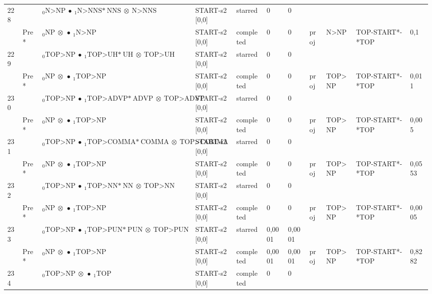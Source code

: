 \documentclass[10pt]{article}
\begin{document}
\begin{longtable}[htbp]{lllllllllll}
228 & & $ {}_0 \textrm{N>NP} \  \bullet \ {}_{1} \textrm{N>NNS*} \ \textrm{NNS} \  \otimes \ \textrm{N>NNS} $ & START-s2 [0,0] & starred & 0 & 0 & & & & \\ 
 & Pre *& $ {}_0 \textrm{NP} \  \otimes \  \bullet \ {}_{1} \textrm{N>NP} $ & START-s2 [0,0] & completed & 0 & 0 & proj & N>NP & TOP-START*-*TOP & 0,1 \\ 
229 & & $ {}_0 \textrm{TOP>NP} \  \bullet \ {}_{1} \textrm{TOP>UH*} \ \textrm{UH} \  \otimes \ \textrm{TOP>UH} $ & START-s2 [0,0] & starred & 0 & 0 & & & & \\ 
 & Pre *& $ {}_0 \textrm{NP} \  \otimes \  \bullet \ {}_{1} \textrm{TOP>NP} $ & START-s2 [0,0] & completed & 0 & 0 & proj & TOP>NP & TOP-START*-*TOP & 0,011 \\ 
230 & & $ {}_0 \textrm{TOP>NP} \  \bullet \ {}_{1} \textrm{TOP>ADVP*} \ \textrm{ADVP} \  \otimes \ \textrm{TOP>ADVP} $ & START-s2 [0,0] & starred & 0 & 0 & & & & \\ 
 & Pre *& $ {}_0 \textrm{NP} \  \otimes \  \bullet \ {}_{1} \textrm{TOP>NP} $ & START-s2 [0,0] & completed & 0 & 0 & proj & TOP>NP & TOP-START*-*TOP & 0,005 \\ 
231 & & $ {}_0 \textrm{TOP>NP} \  \bullet \ {}_{1} \textrm{TOP>COMMA*} \ \textrm{COMMA} \  \otimes \ \textrm{TOP>COMMA} $ & START-s2 [0,0] & starred & 0 & 0 & & & & \\ 
 & Pre *& $ {}_0 \textrm{NP} \  \otimes \  \bullet \ {}_{1} \textrm{TOP>NP} $ & START-s2 [0,0] & completed & 0 & 0 & proj & TOP>NP & TOP-START*-*TOP & 0,0553 \\ 
232 & & $ {}_0 \textrm{TOP>NP} \  \bullet \ {}_{1} \textrm{TOP>NN*} \ \textrm{NN} \  \otimes \ \textrm{TOP>NN} $ & START-s2 [0,0] & starred & 0 & 0 & & & & \\ 
 & Pre *& $ {}_0 \textrm{NP} \  \otimes \  \bullet \ {}_{1} \textrm{TOP>NP} $ & START-s2 [0,0] & completed & 0 & 0 & proj & TOP>NP & TOP-START*-*TOP & 0,0005 \\ 
233 & & $ {}_0 \textrm{TOP>NP} \  \bullet \ {}_{1} \textrm{TOP>PUN*} \ \textrm{PUN} \  \otimes \ \textrm{TOP>PUN} $ & START-s2 [0,0] & starred & 0,0001 & 0,0001 & & & & \\ 
 & Pre *& $ {}_0 \textrm{NP} \  \otimes \  \bullet \ {}_{1} \textrm{TOP>NP} $ & START-s2 [0,0] & completed & 0,0001 & 0,0001 & proj & TOP>NP & TOP-START*-*TOP & 0,8282 \\ 
234 & & $ {}_0 \textrm{TOP>NP} \  \otimes \  \bullet \ {}_{1} \textrm{TOP} $ & START-s2 [0,0] & completed & 0 & 0 & & & & \\ 

\end{longtable}
\end{document}
